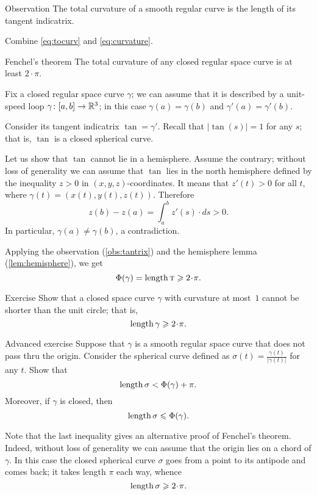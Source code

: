 \begin{thm}{Observation}\label{obs:tantrix}
The total curvature of a smooth regular curve is the length of its tangent indicatrix.
\end{thm}

Combine \ref{eq:tocurv} and \ref{eq:curvature}.
\qedsf %


\begin{thm}{Fenchel's theorem}\label{thm:fenchel}
The total curvature of any closed regular space curve is at least $2\cdot\pi$.
\end{thm}

Fix a closed regular space curve $\gamma$;
we can assume that it is described by a unit-speed loop $\gamma\colon[a,b]\to \mathbb{R}^3$;
in this case $\gamma(a)=\gamma(b)$ and $\gamma'(a)=\gamma'(b)$.

Consider its tangent indicatrix $\tan=\gamma'$.
Recall that $|\tan(s)|=1$ for any $s$; that is, $\tan$ is a closed spherical curve.

Let us show that $\tan$ cannot lie in a hemisphere.
Assume the contrary; without loss of generality we can assume that $\tan$ lies in the north hemisphere defined by the inequality $z>0$ in $(x,y,z)$-coordinates.
It means that $z'(t)>0$ for all $t$, where $\gamma(t)=(x(t), y(t), z(t))$.
Therefore 
\[z(b)-z(a)=\int_a^b z'(s)\cdot ds>0.\]
In particular, $\gamma(a)\ne \gamma(b)$, a contradiction.

Applying the observation (\ref{obs:tantrix}) and the hemisphere lemma (\ref{lem:hemisphere}), we get  
\[\tc\gamma=\length \tan\ge2\cdot\pi.\]
\qedsf

\begin{thm}{Exercise}\label{ex:length>=2pi}
Show that a closed space curve $\gamma$ with curvature at most~$1$ cannot be shorter than the unit circle;
that is, 
\[\length\gamma\ge 2\cdot \pi.\]

\end{thm}


\begin{thm}{Advanced exercise}\label{ex:gamma/|gamma|}
Suppose that $\gamma$ is a smooth regular space curve that does not pass thru the origin.
Consider the spherical curve defined as $\sigma(t)=\frac{\gamma(t)}{|\gamma(t)|}$ for any $t$.
Show that 
\[\mathop{\rm length}\nolimits \sigma< \Phi({\gamma})+\pi.\]
Moreover, if $\gamma$ is closed, then
\[\mathop{\rm length}\nolimits \sigma\leqslant \Phi({\gamma}).\]
\end{thm}

Note that the last inequality gives an alternative proof of Fenchel's theorem.
Indeed, without loss of generality we can assume that the origin lies on a chord of $\gamma$.
In this case the closed spherical curve $\sigma$ goes from a point to its antipode and comes back; 
it takes length $\pi$ each way, 
whence 
\[\length\sigma\ge 2\cdot\pi.\]



